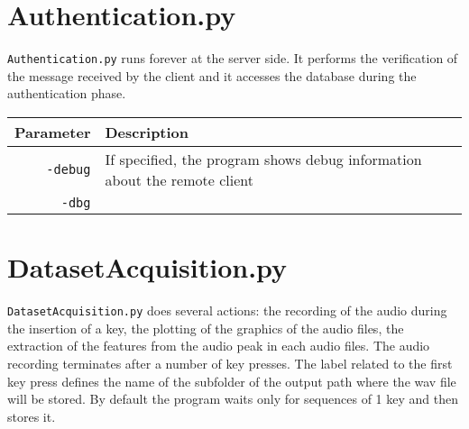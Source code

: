 \section{Authentication.py}
\texttt{Authentication.py} runs forever at the server side. It performs the verification of the message received by the client and it accesses the database during the authentication phase.
\begin{table}[h]
\centering\footnotesize
\begin{tabular}{rl}
\hline
\textbf{Parameter} & \textbf{Description}\\
\hline
\texttt{-debug} & If specified, the program shows debug information about the remote client\\
\texttt{-dbg} &\\
\hline
\end{tabular}
\end{table}

\section{DatasetAcquisition.py}
\texttt{DatasetAcquisition.py} does several actions: the recording of the audio during the insertion of a key, the plotting of the graphics of the audio files, the extraction of the features from the audio peak in each audio files. The audio recording terminates after a number of key presses. The label related to the first key press defines the name of the subfolder of the output path where the wav file will be stored. By default the program waits only for sequences of 1 key and then stores it.

